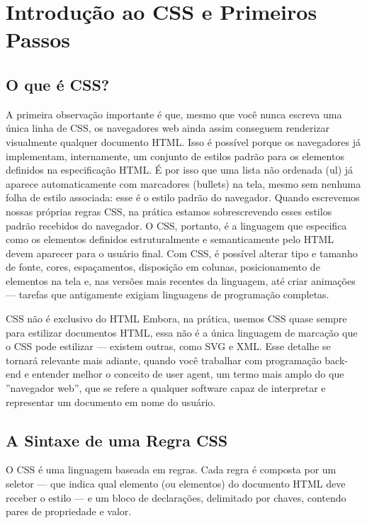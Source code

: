 \chapter{Introdução ao CSS e Primeiros Passos}

\section{O que é CSS?}

A primeira observação importante é que, mesmo que você nunca escreva uma única linha de CSS, os navegadores web ainda assim conseguem renderizar visualmente qualquer documento HTML. Isso é possível porque os navegadores já implementam, internamente, um conjunto de estilos padrão para os elementos definidos na especificação HTML. É por isso que uma lista não ordenada (ul) já aparece automaticamente com marcadores (bullets) na tela, mesmo sem nenhuma folha de estilo associada: esse é o estilo padrão do navegador. Quando escrevemos nossas próprias regras CSS, na prática estamos sobrescrevendo esses estilos padrão recebidos do navegador. O CSS, portanto, é a linguagem que especifica como os elementos definidos estruturalmente e semanticamente pelo HTML devem aparecer para o usuário final. Com CSS, é possível alterar tipo e tamanho de fonte, cores, espaçamentos, disposição em colunas, posicionamento de elementos na tela e, nas versões mais recentes da linguagem, até criar animações — tarefas que antigamente exigiam linguagens de programação completas.

\begin{infobox}{CSS não é exclusivo do HTML}
Embora, na prática, usemos CSS quase sempre para estilizar documentos HTML, essa não é a única linguagem de marcação que o CSS pode estilizar — existem outras, como SVG e XML. Esse detalhe se tornará relevante mais adiante, quando você trabalhar com programação back-end e entender melhor o conceito de user agent, um termo mais amplo do que ”navegador web”, que se refere a qualquer software capaz de interpretar e representar um documento em nome do usuário.
\end{infobox}

\section{A Sintaxe de uma Regra CSS}

O CSS é uma linguagem baseada em regras. Cada regra é composta por um seletor — que indica qual elemento (ou elementos) do documento HTML deve receber o estilo — e um bloco de declarações, delimitado por chaves, contendo pares de propriedade e valor.

